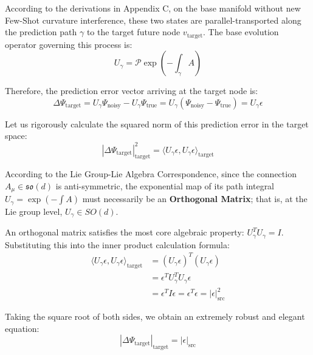 \documentclass{article}
\begin{document}
According to the derivations in Appendix C, on the base manifold without new Few-Shot curvature interference, these two states are parallel-transported along the prediction path $\gamma$ to the target future node $v_{\text{target}}$. The base evolution operator governing this process is:
\begin{equation}
U_\gamma = \mathcal{P}\exp \left( -\int_\gamma A \right)
\end{equation}

Therefore, the prediction error vector arriving at the target node is:
\begin{equation}
\Delta\Psi_{\text{target}} = U_\gamma \Psi_{\text{noisy}} - U_\gamma \Psi_{\text{true}} = U_\gamma (\Psi_{\text{noisy}} - \Psi_{\text{true}}) = U_\gamma \epsilon
\end{equation}

Let us rigorously calculate the squared norm of this prediction error in the target space:
\begin{equation}
|\Delta\Psi_{\text{target}}|^2_{\text{target}} = \langle U_\gamma \epsilon, U_\gamma \epsilon \rangle_{\text{target}}
\end{equation}

According to the Lie Group-Lie Algebra Correspondence, since the connection $A_\mu \in \mathfrak{so}(d)$ is anti-symmetric, the exponential map of its path integral $U_\gamma = \exp(-\int A)$ must necessarily be an \textbf{Orthogonal Matrix}; that is, at the Lie group level, $U_\gamma \in SO(d)$.

An orthogonal matrix satisfies the most core algebraic property: $U_\gamma^T U_\gamma = I$. Substituting this into the inner product calculation formula:
\begin{equation}
\begin{aligned}
\langle U_\gamma \epsilon, U_\gamma \epsilon \rangle_{\text{target}} &= (U_\gamma \epsilon)^T (U_\gamma \epsilon) \\
&= \epsilon^T U_\gamma^T U_\gamma \epsilon \\
&= \epsilon^T I \epsilon = \epsilon^T \epsilon = |\epsilon|^2_{\text{src}}
\end{aligned}
\end{equation}

Taking the square root of both sides, we obtain an extremely robust and elegant equation:
\begin{equation}
|\Delta\Psi_{\text{target}}|_{\text{target}} = |\epsilon|_{\text{src}}
\end{equation}
\end{document}
